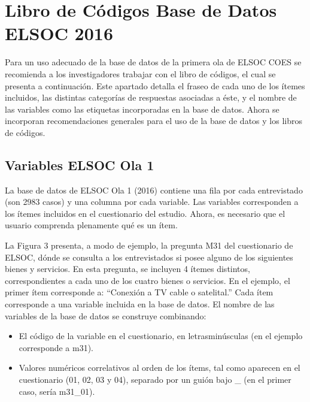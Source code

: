 \documentclass[
]{book}
\providecommand{\tightlist}{%
  \setlength{\itemsep}{0pt}\setlength{\parskip}{0pt}}
\begin{document}
\hypertarget{libro-de-cuxf3digos-base-de-datos-elsoc-2016}{%
\chapter{Libro de Códigos Base de Datos ELSOC
2016}\label{libro-de-cuxf3digos-base-de-datos-elsoc-2016}}

Para un uso adecuado de la base de datos de la primera ola de ELSOC COES
se recomienda a los investigadores trabajar con el libro de códigos, el
cual se presenta a continuación. Este apartado detalla el fraseo de cada
uno de los ítemes incluidos, las distintas categorías de respuestas
asociadas a éste, y el nombre de las variables como las etiquetas
incorporadas en la base de datos. Ahora se incorporan recomendaciones
generales para el uso de la base de datos y los libros de códigos.

\hypertarget{variables-elsoc-ola-1}{%
\section{Variables ELSOC Ola 1}\label{variables-elsoc-ola-1}}

La base de datos de ELSOC Ola 1 (2016) contiene una fila por cada
entrevistado (son 2983 casos) y una columna por cada variable. Las
variables corresponden a los ítemes incluidos en el cuestionario del
estudio. Ahora, es necesario que el usuario comprenda plenamente qué es
un ítem.

La Figura 3 presenta, a modo de ejemplo, la pregunta M31 del
cuestionario de ELSOC, dónde se consulta a los entrevistados si posee
alguno de los siguientes bienes y servicios. En esta pregunta, se
incluyen 4 ítemes distintos, correspondientes a cada uno de los cuatro
bienes o servicios. En el ejemplo, el primer ítem corresponde a:
``Conexión a TV cable o satelital.'' Cada ítem corresponde a una
variable incluida en la base de datos. El nombre de las variables de la
base de datos se construye combinando:

\begin{itemize}
\tightlist
\item
  El código de la variable en el cuestionario, en letrasminúsculas (en
  el ejemplo corresponde a m31).
\item
  Valores numéricos correlativos al orden de los ítems, tal como
  aparecen en el cuestionario (01, 02, 03 y 04), separado por un guión
  bajo \_ (en el primer caso, sería m31\_01).
\end{itemize}
\end{document}
